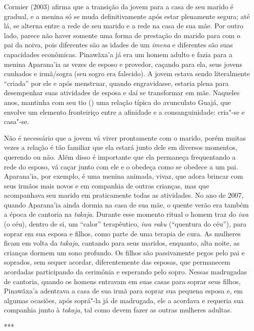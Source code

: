 Cormier (2003) afirma que a transição da jovem para a casa de seu marido
é gradual, e a menina só se muda definitivamente após estar plenamente
segura; até lá, se alterna entre a rede de seu marido e a rede na casa
de sua mãe. Por outro lado, parece não haver somente uma forma de
prestação do marido para com o pai da noiva, pois diferentes são as
idades de um \emph{imena} e diferentes são suas capacidades econômicas.
Pinawãxa'a já era um homem adulto e fazia para a menina Aparana'ia as
vezes de esposo e provedor, caçando para ela, seus jovens cunhados e
irmã/sogra (seu sogro era falecido). A jovem estava sendo literalmente
``criada'' por ele e após menstruar, quando engravidasse, estaria plena
para desempenhar suas atividades de esposa e daí se transformar em mãe.
Naqueles anos, mantinha com seu tio () uma relação típica do
avunculato Guajá, que envolve um elemento fronteiriço entre a afinidade
e a consanguinidade: cria"-se e casa"-se.

Não é necessário que a jovem vá viver prontamente com o marido, porém
muitas vezes a relação é tão familiar que ela estará junto dele em
diversos momentos, querendo ou não. Além disso é importante que ela
permaneça frequentando a rede do esposo, vá caçar junto com ele e o
obedeça como se obedece a um pai. Aparana'ia, por exemplo, é uma menina
animada, vivaz, que adora brincar com seus irmãos mais novos e em
companhia de outras crianças, mas que acompanhava seu marido em
praticamente todas as atividades. No ano de 2007, quando Aparana'ia
ainda dormia na casa de sua mãe, o quente verão era também a época de
cantoria na \emph{takaja}. Durante esse momento ritual o homem traz do
\emph{iwa} (o céu), dentro de si, um ``calor'' terapêutico, \emph{iwa
raku} (``quentura do céu''), para soprar em sua esposa e filhos, como
parte de uma terapia de cura. As mulheres ficam em volta da
\emph{takaja}, cantando para seus maridos, enquanto, alta noite, as
crianças dormem um sono profundo. Os filhos são passivamente pegos pelo
pai e soprados, sem sequer acordar, diferentemente das esposas, que
permanecem acordadas participando da cerimônia e esperando pelo sopro.
Nessas madrugadas de cantoria, quando os homens entravam em suas casas
para soprar seus filhos, Pinawãxa'a adentrava a casa de sua irmã para
soprar sua pequena esposa e, em algumas ocasiões, após soprá"-la já de
madrugada, ele a acordava e requeria sua companhia junto à
\emph{takaja}, tal como devem fazer as outras mulheres adultas.

\begin{center}
***
\end{center}

